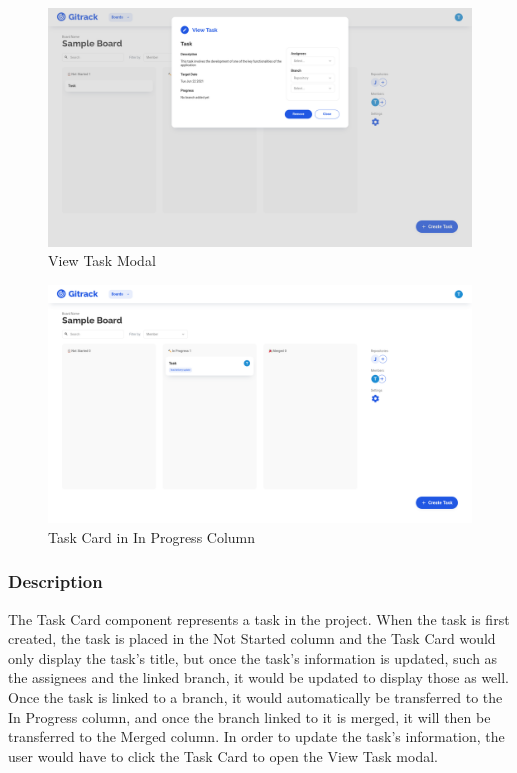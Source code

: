 \documentclass{article}
\begin{document}
\begin{figure}[H]
	\includegraphics[width=1\textwidth]{view-task}\par\vspace{0.5cm}
	\caption{View Task Modal}
	\label{fig:task-in-progress}
\end{figure}

\begin{figure}[H]
	\includegraphics[width=1\textwidth]{task-in-progress}\par\vspace{0.5cm}
	\caption{Task Card in In Progress Column}
	\label{fig:task-in-progress}
\end{figure}
\subsubsection{Description}
The Task Card component represents a task in the project. When the task is first
created, the task is placed in the Not Started column and the Task Card would
only display the task’s title, but once the task’s information is updated, such
as the assignees and the linked branch, it would be updated to display those as
well. Once the task is linked to a branch, it would automatically be transferred
to the In Progress column, and once the branch linked to it is merged, it will
then be transferred to the Merged column. In order to update the task’s
information, the user would have to click the Task Card to open the View Task
modal.
\end{document}
